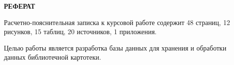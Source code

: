 \begin{center}
	\textbf{РЕФЕРАТ}
\end{center}

Расчетно-пояснительная записка к курсовой работе содержит 48 страниц, 12 рисунков, 15 таблиц, 20 источников, 1 приложения.

Целью работы является разработка базы данных для хранения и обработки данных библиотечной картотеки.